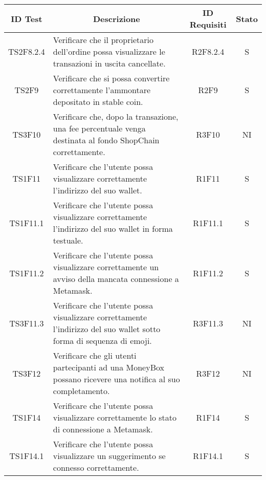 \begin{table}[H]
  \centering
  \renewcommand{\arraystretch}{1.8}
  \begin{tabular}{c|p{8cm}|c|c}
    \rowcolor[HTML]{125E28}
    \color[HTML]{FFFFFF}\textbf{ID Test}
              & \multicolumn{1}{c}{\color[HTML]{FFFFFF}\textbf{Descrizione}}
              & \color[HTML]{FFFFFF}\textbf{ID Requisiti}
              & \color[HTML]{FFFFFF}\textbf{Stato}                                                                                                                     \\
    \hline
    TS2F8.2.4 & Verificare che il proprietario dell'ordine possa visualizzare le transazioni in uscita cancellate.                                     & R2F8.2.4 & S  \\
    TS2F9     & Verificare che si possa convertire correttamente l'ammontare depositato in stable coin\glo{}.                                          & R2F9     & S  \\
    TS3F10    & Verificare che, dopo la transazione, una fee percentuale venga destinata al fondo ShopChain correttamente.                             & R3F10    & NI \\
    TS1F11    & Verificare che l'utente possa visualizzare correttamente l'indirizzo del suo wallet\glo{}.                                             & R1F11    & S  \\
    TS1F11.1  & Verificare che l'utente possa visualizzare correttamente l'indirizzo del suo wallet\glo{} in forma testuale.                           & R1F11.1  & S  \\
    TS1F11.2  & Verificare che l'utente possa visualizzare correttamente un avviso della mancata connessione a Metamask\glo{}.                         & R1F11.2  & S  \\
    TS3F11.3  & Verificare che l'utente possa visualizzare correttamente l'indirizzo del suo wallet\glo{} sotto forma di sequenza di emoji.            & R3F11.3  & NI \\
    TS3F12    & Verificare che gli utenti partecipanti ad una MoneyBox\glo{} possano ricevere una notifica al suo completamento.                       & R3F12    & NI \\
    TS1F14    & Verificare che l'utente possa visualizzare correttamente lo stato di connessione a Metamask\glo{}.                                     & R1F14    & S  \\
    TS1F14.1  & Verificare che l'utente possa visualizzare un suggerimento se connesso correttamente.                                                  & R1F14.1  & S  \\

\end{tabular}
\end{table}
